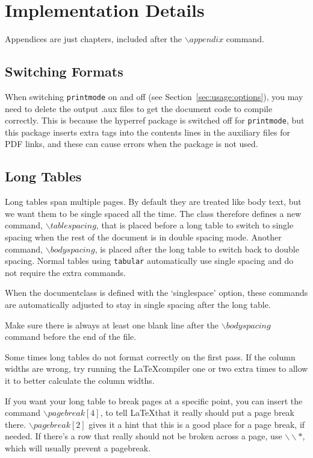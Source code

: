 \chapter{Implementation Details\label{ch:implementation}}

Appendices are just chapters, included after the $\backslash appendix$ command.

\section{Switching Formats}
When switching \texttt{printmode} on and off (see Section~\ref{sec:usage:options}), you may need to delete the output .aux files to get the document code to compile correctly. This is because the hyperref package is switched off for \texttt{printmode}, but this package inserts extra tags into the contents lines in the auxiliary files for PDF links, and these can cause errors when the package is not used.

\section{Long Tables}

Long tables span multiple pages. By default they are treated like body text, but we want them to be single spaced all the time. The class therefore defines a new command, $\backslash tablespacing$, that is placed before a long table to switch to single spacing when the rest of the document is in double spacing mode. Another command, $\backslash bodyspacing$, is placed after the long table to switch back to double spacing. Normal tables using \texttt{tabular} automatically use single spacing and do not require the extra commands.

When the documentclass is defined with the `singlespace' option, these commands are automatically adjusted to stay in single spacing after the long table.

Make sure there is always at least one blank line after the $\backslash bodyspacing$ command before the end of the file.

Some times long tables do not format correctly on the first pass. If the column widths are wrong, try running the \LaTeX compiler one or two extra times to allow it to better calculate the column widths.

If you want your long table to break pages at a specific point, you can insert the command $\backslash pagebreak[4]$, to tell \LaTeX that it really should put a page break there. $\backslash pagebreak[2]$ gives it a hint that this is a good place for a page break, if needed. If there's a row that really should not be broken across a page, use $\backslash \backslash *$, which will usually prevent a pagebreak.

